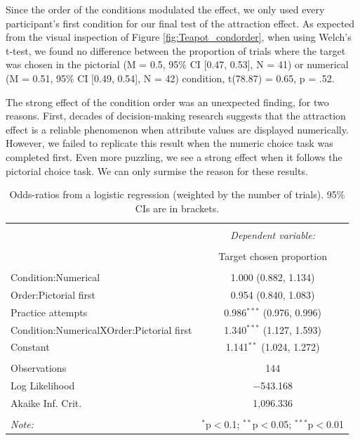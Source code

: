 \documentclass[11pt,a4paper]{article}
\begin{document}
Since the order of the conditions modulated the effect, we only used every participant's first condition for our final test of the attraction effect. As expected from the visual inspection of Figure \ref{fig:Teapot_condorder}, when using Welch's t-test, we found no difference between the proportion of trials where the target was chosen in the pictorial (M = 0.5, 95\% CI [0.47, 0.53], N = 41) or numerical (M = 0.51, 95\% CI [0.49, 0.54], N = 42) condition, t(78.87) = 0.65, p = .52.

The strong effect of the condition order was an unexpected finding, for two reasons. First, decades of decision-making research suggests that the attraction effect is a reliable phenomenon when attribute values are displayed numerically. However, we failed to replicate this result when the numeric choice task was completed first. Even more puzzling, we see a strong effect when it follows the pictorial choice task. We can only surmise the reason for these results.

%

\begin{table}[!htbp] \centering 
\captionsetup{justification=centering}
  \caption{Odds-ratios from a logistic regression (weighted by the number of trials). 95\% CIs are in brackets.} 
  \label{mixedeff} 
\begin{tabular}{@{\extracolsep{5pt}}lc} 
\\[-1.8ex]\hline 
\hline \\[-1.8ex] 
 & \multicolumn{1}{c}{\textit{Dependent variable:}} \\ 
\cline{2-2} 
\\[-1.8ex] & Target chosen proportion \\ 
\hline \\[-1.8ex] 
 Condition:Numerical & 1.000 (0.882, 1.134) \\ 
  Order:Pictorial first & 0.954 (0.840, 1.083) \\ 
  Practice attempts & 0.986$^{***}$ (0.976, 0.996) \\ 
  Condition:NumericalXOrder:Pictorial first & 1.340$^{***}$ (1.127, 1.593) \\ 
  Constant & 1.141$^{**}$ (1.024, 1.272) \\ 
 \hline \\[-1.8ex] 
Observations & 144 \\ 
Log Likelihood & $-$543.168 \\ 
Akaike Inf. Crit. & 1,096.336 \\ 
\hline 
\hline \\[-1.8ex] 
\textit{Note:}  & \multicolumn{1}{r}{$^{*}$p$<$0.1; $^{**}$p$<$0.05; $^{***}$p$<$0.01} \\ 
\end{tabular} 
\end{table} 
\end{document}
